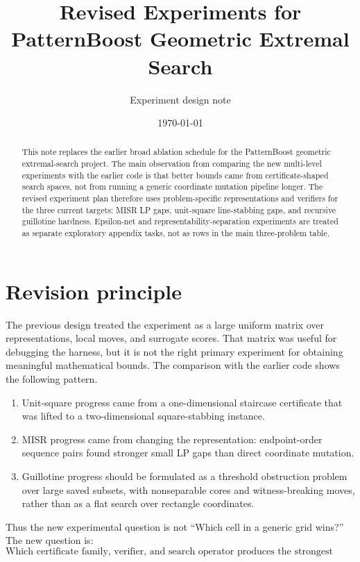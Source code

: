\documentclass[11pt]{article}
\title{Revised Experiments for PatternBoost Geometric Extremal Search}
\author{Experiment design note}
\date{\today}
\begin{document}
\maketitle

\begin{abstract}
This note replaces the earlier broad ablation schedule for the PatternBoost
geometric extremal-search project.  The main observation from comparing the
new multi-level experiments with the earlier code is that better bounds came
from certificate-shaped search spaces, not from running a generic coordinate
mutation pipeline longer.  The revised experiment plan therefore uses
problem-specific representations and verifiers for the three current targets:
MISR LP gaps, unit-square line-stabbing gaps, and recursive guillotine
hardness.  Epsilon-net and representability-separation experiments are treated
as separate exploratory appendix tasks, not as rows in the main three-problem
table.
\end{abstract}

\section{Revision principle}

The previous design treated the experiment as a large uniform matrix over
representations, local moves, and surrogate scores.  That matrix was useful for
debugging the harness, but it is not the right primary experiment for obtaining
meaningful mathematical bounds.  The comparison with the earlier code shows the
following pattern.

\begin{enumerate}
\item Unit-square progress came from a one-dimensional staircase certificate
that was lifted to a two-dimensional square-stabbing instance.
\item MISR progress came from changing the representation: endpoint-order
sequence pairs found stronger small LP gaps than direct coordinate mutation.
\item Guillotine progress should be formulated as a threshold obstruction
problem over large saved subsets, with nonseparable cores and witness-breaking
moves, rather than as a flat search over rectangle coordinates.
\end{enumerate}

Thus the new experimental question is not ``Which cell in a generic grid wins?''
The new question is:
\[
        \text{Which certificate family, verifier, and search operator
        produces the strongest auditable bound?}
\]
\end{document}
